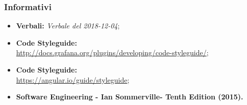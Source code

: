 \subsubsection{Informativi}
\begin{itemize}
		\item \textbf{Verbali:} \emph{Verbale del 2018-12-04};
	\item \textbf{ Code Styleguide:} \\
	\url{http://docs.grafana.org/plugins/developing/code-styleguide/};
	\item \textbf{ Code Styleguide:} \\
	\url{https://angular.io/guide/styleguide};
	\item \textbf{Software Engineering - Ian Sommerville- Tenth Edition (2015).}
\end{itemize}
\pagebreak